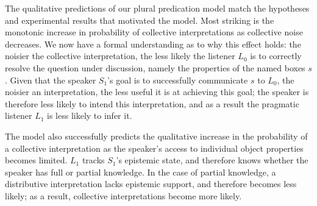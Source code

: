 \documentclass[linguex]{sp}
\begin{document}



The qualitative predictions of our plural predication model match the hypotheses and experimental results that motivated the model. Most striking is the monotonic increase in probability of collective interpretations as collective noise decreases. We now have a formal understanding as to why this effect holds: the noisier the collective interpretation, the less likely the listener $L_{0}$ is to correctly resolve the question under discussion, namely the properties of the named boxes $s$. Given that the speaker $S_{1}$'s goal is to successfully communicate $s$ to $L_{0}$, the noisier an interpretation, the less useful it is at achieving this goal; the speaker is therefore less likely to intend this interpretation, and as a result the pragmatic listener $L_{1}$ is less likely to infer it.

The model also successfully predicts the qualitative increase in the probability of a collective interpretation as the speaker's  access to individual object properties becomes limited. %
$L_{1}$ tracks  $S_{1}$'s epistemic state, and therefore knows whether the speaker has full or partial knowledge. In the case of partial knowledge, a distributive interpretation lacks epistemic support, and therefore becomes less likely; as a result, collective interpretations become more likely.

\end{document}
